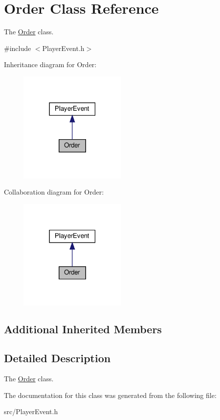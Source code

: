\hypertarget{classOrder}{}\section{Order Class Reference}
\label{classOrder}


The \hyperlink{classOrder}{Order} class.  




{\ttfamily \#include $<$Player\+Event.\+h$>$}



Inheritance diagram for Order\+:
\nopagebreak
\begin{figure}[H]
\begin{center}
\leavevmode
\includegraphics[width=150pt]{classOrder__inherit__graph}
\end{center}
\end{figure}


Collaboration diagram for Order\+:
\nopagebreak
\begin{figure}[H]
\begin{center}
\leavevmode
\includegraphics[width=150pt]{classOrder__coll__graph}
\end{center}
\end{figure}
\subsection*{Additional Inherited Members}


\subsection{Detailed Description}
The \hyperlink{classOrder}{Order} class. 

The documentation for this class was generated from the following file\+:\begin{DoxyCompactItemize}
\item 
src/Player\+Event.\+h\end{DoxyCompactItemize}

